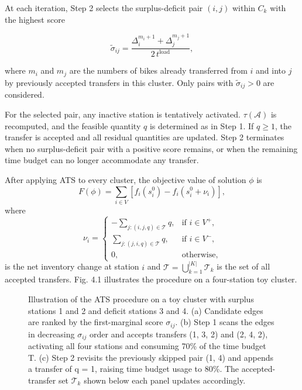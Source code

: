 \documentclass[11pt]{article}
\numberwithin{table}{section}
\numberwithin{figure}{section}
\begin{document}
At each iteration, Step 2 selects the surplus-deficit pair $(i,j)$ within ${{C}_{k}}$ with the highest score

\[
{{\tilde{\sigma }}_{ij}}=\frac{\Delta _{i}^{{{m}_{i}}+1}+\Delta _{j}^{{{m}_{j}}+1}}{2\,{{t}^{\text{load}}}},
\]

where ${{m}_{i}}$ and ${{m}_{j}}$ are the numbers of bikes already transferred from $i$ and into $j$ by previously accepted transfers in this cluster. Only pairs with ${{\tilde{\sigma }}_{ij}}>0$ are considered.

For the selected pair, any inactive station is tentatively activated. $\tau \left( \mathcal{A} \right)$ is recomputed, and the feasible quantity $q$ is determined as in Step 1. If $q\ge 1$, the transfer is accepted and all residual quantities are updated. Step 2 terminates when no surplus-deficit pair with a positive score remains, or when the remaining time budget can no longer accommodate any transfer.

After applying ATS to every cluster, the objective value of solution $\phi$ is
\[
F(\phi)=\sum_{i\in V}\left[f_i(s_i^0)-f_i(s_i^0+\nu_i)\right],
\]
where
\[
\nu_i=\begin{cases}
-\sum_{j:(i,j,q)\in\mathcal{T}} q, & \text{if } i\in V^{+},\\
\sum_{j:(j,i,q)\in\mathcal{T}} q, & \text{if } i\in V^{-},\\
0, & \text{otherwise},
\end{cases}
\]
is the net inventory change at station $i$ and $\mathcal{T}=\bigcup_{k=1}^{|K|}\mathcal{T}_k$ is the set of all accepted transfers. Fig. 4.1 illustrates the procedure on a four-station toy cluster.

\begin{figure}[htbp]
\centering
{}
\caption{Illustration of the ATS procedure on a toy cluster with surplus stations 1 and 2 and deficit stations 3 and 4. (a) Candidate edges are ranked by the first-marginal score $\sigma_{ij}$. (b) Step 1 scans the edges in decreasing $\sigma_{ij}$ order and accepts transfers (1, 3, 2) and (2, 4, 2), activating all four stations and consuming 70\% of the time budget T. (c) Step 2 revisits the previously skipped pair (1, 4) and appends a transfer of q = 1, raising time budget usage to 80\%. The accepted-transfer set $\mathcal{T}_k$ shown below each panel updates accordingly.}
\end{figure}
\end{document}
